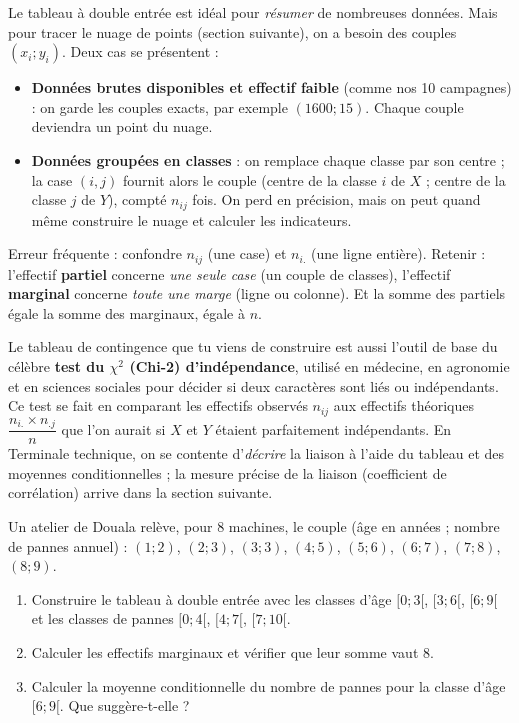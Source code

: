 \documentclass[11pt]{article}
\newcommand{\cle}[1]{{\popxbold\color{popdark}#1}}
\newcounter{popsec}
\newcounter{popsub}
\newcommand{\courssub}[1]{%
  \stepcounter{popsub}%
  \par\vspace{9pt}\noindent{\popxbold\fontsize{11.5}{13}\selectfont\color{popink}{\color{poporange}\thepopsec.\thepopsub}\hspace{6pt}#1}\par\nopagebreak\vspace{4pt}
}
\begin{document}
\courssub{Du tableau brut au tableau de valeurs $(x_i, y_i)$}

Le tableau à double entrée est idéal pour \emph{résumer} de nombreuses données. Mais pour tracer le \cle{nuage de points} (section suivante), on a besoin des couples $(x_i ; y_i)$. Deux cas se présentent :

\begin{itemize}
\item \textbf{Données brutes disponibles et effectif faible} (comme nos 10 campagnes) : on garde les couples exacts, par exemple $(1600 ; 15)$. Chaque couple deviendra un point du nuage.
\item \textbf{Données groupées en classes} : on remplace chaque classe par son \cle{centre} ; la case $(i,j)$ fournit alors le couple (centre de la classe $i$ de $X$ ; centre de la classe $j$ de $Y$), compté $n_{ij}$ fois. On perd en précision, mais on peut quand même construire le nuage et calculer les indicateurs.
\end{itemize}

\begin{attention}
Erreur fréquente : confondre $n_{ij}$ (une case) et $n_{i.}$ (une ligne entière). Retenir : l'effectif \textbf{partiel} concerne \emph{une seule case} (un couple de classes), l'effectif \textbf{marginal} concerne \emph{toute une marge} (ligne ou colonne). Et la somme des partiels égale la somme des marginaux, égale à $n$.
\end{attention}

\begin{savaistu}
Le tableau de contingence que tu viens de construire est aussi l'outil de base du célèbre \textbf{test du $\chi^2$ (Chi-2) d'indépendance}, utilisé en médecine, en agronomie et en sciences sociales pour décider si deux caractères sont liés ou indépendants. Ce test se fait en comparant les effectifs observés $n_{ij}$ aux effectifs théoriques $\dfrac{n_{i.} \times n_{.j}}{n}$ que l'on aurait si $X$ et $Y$ étaient parfaitement indépendants. En Terminale technique, on se contente d'\emph{décrire} la liaison à l'aide du tableau et des moyennes conditionnelles ; la mesure précise de la liaison (coefficient de corrélation) arrive dans la section suivante.
\end{savaistu}

\begin{exercice}
Un atelier de Douala relève, pour 8 machines, le couple (âge en années ; nombre de pannes annuel) : $(1 ; 2)$, $(2 ; 3)$, $(3 ; 3)$, $(4 ; 5)$, $(5 ; 6)$, $(6 ; 7)$, $(7 ; 8)$, $(8 ; 9)$.
\begin{enumerate}
\item Construire le tableau à double entrée avec les classes d'âge $[0 ; 3[$, $[3 ; 6[$, $[6 ; 9[$ et les classes de pannes $[0 ; 4[$, $[4 ; 7[$, $[7 ; 10[$.
\item Calculer les effectifs marginaux et vérifier que leur somme vaut $8$.
\item Calculer la moyenne conditionnelle du nombre de pannes pour la classe d'âge $[6 ; 9[$. Que suggère-t-elle ?
\end{enumerate}
\end{exercice}
\end{document}
